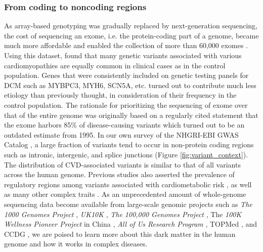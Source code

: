 \documentclass[letter]{bioinfo}
\begin{document}
\subsubsection*{From coding to noncoding regions}	
	As array-based genotyping was gradually replaced by next-generation sequencing, the cost of sequencing an exome, i.e. the protein-coding part of a genome, became much more affordable and enabled the collection of more than 60,000 exomes \citep{Lek:2016:Analysis}. Using this dataset, \cite{Walsh:2017:Reassessment} found that many genetic variants associated with various cardiomyopathies are equally common in clinical cases as in the control population. Genes that were consistently included on genetic testing panels for DCM such as MYBPC3, MYH6, SCN5A, etc. turned out to contribute much less etiology than previously thought, in consideration of their frequency in the control population.  The rationale for prioritizing the sequencing of exome over that of the entire genome was originally based on a regularly cited statement that the exome harbors 85\% of disease-causing variants \citep{Antonarakis:2001:nature} which turned out to be an outdated estimate from 1995. In our own survey of the NHGRI-EBI GWAS Catalog \citep{MacArthur:2017:new}, a large fraction of variants tend to occur in non-protein coding regions such as intronic, intergenic, and splice junctions (Figure \ref{fig:variant_context}). The distribution of CVD-associated variants is similar to that of all variants across the human genome. Previous studies also asserted the prevalence of regulatory regions among variants associated with cardiometabolic risk \citep{Franzen:2016:Cardiometabolic}, as well as many other complex traits \citep{Pickrell:2014:Joint}. As an unprecedented amount of whole-genome sequencing data become available from large-scale genomic projects such as \textit{The 1000 Genomes Project} \citep{1000G:2015:global}, \textit{UK10K} \citep{TheUK10KConsortium:2015:UK10K}, \textit{The 100,000 Genomes Project} \citep{Caulfield:2017:100K}, The \textit{100K Wellness Pioneer Project} in China \citep{Kalia:2017:China}, \textit{All of Us Research Program} \citep{NIH:2018:All}, TOPMed \citep{NHLBI:2014:TransOmics}, and CCDG \citep{NHGRI:2016:CCDG}, we are poised to learn more about this dark matter in the human genome and how it works in complex diseases.
\end{document}
